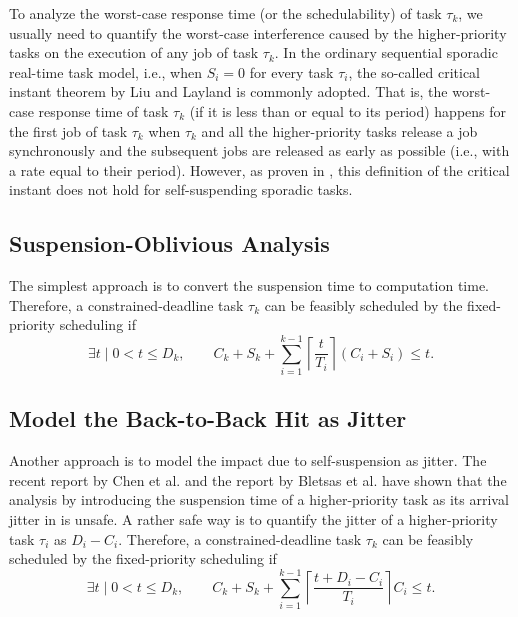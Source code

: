 \documentclass[10pt,conference,preprint]{IEEEtran}
\newcommand{\ceiling}[1]{\left\lceil{#1}\right\rceil}
\begin{document}
To analyze the worst-case response time (or the schedulability) of task $\tau_k$, we usually need to quantify the worst-case interference caused by the higher-priority tasks on the execution of any job of task $\tau_k$. In the ordinary sequential sporadic real-time task model, i.e., when $S_i=0$ for every task $\tau_i$, the so-called critical instant theorem by Liu and Layland \cite{Liu_1973} is commonly adopted. That is, the worst-case response time of task $\tau_k$ (if it is less than or equal to its period) happens for the first job of task $\tau_k$ when $\tau_k$ and all the higher-priority tasks release a job synchronously and the subsequent jobs are released as early as possible (i.e., with a rate equal to their period).  However, as proven in \cite{ecrts15nelissen}, this definition of the
critical instant does not hold for self-suspending sporadic tasks.  

\subsection{Suspension-Oblivious Analysis}
The simplest approach is to convert the suspension time to computation
time. Therefore, a constrained-deadline task $\tau_k$ can be feasibly
scheduled by the fixed-priority scheduling if
\begin{equation}
\label{eq:TDA-SO}
\exists t \mid 0 < t \leq D_k, \qquad C_k + S_k + \sum_{i=1}^{k-1}\ceiling{\frac{t}{T_i}} (C_i+S_i) \leq t.
\end{equation}

\subsection{Model the Back-to-Back Hit as Jitter}
\label{sec:jitter}

Another approach is to model the impact due to self-suspension as
jitter.  The recent report by Chen et al. and the report by Bletsas et
al. \cite{BletsasReport2015} have shown that the analysis by
introducing the suspension time of a higher-priority task as its
arrival jitter in
\cite{ECRTS-AudsleyB04,RTAS-AudsleyB04,RTCSA-KimCPKH95,MingLiRTCSA1994}
is unsafe.  A rather safe way is to quantify the jitter of a higher-priority
task $\tau_i$ as $D_i-C_i$. Therefore, a constrained-deadline task
$\tau_k$ can be feasibly scheduled by the fixed-priority scheduling if
\begin{equation}
\label{eq:TDA-jitter}
\exists t \mid 0 < t \leq D_k, \qquad C_k + S_k + \sum_{i=1}^{k-1}\ceiling{\frac{t+D_i-C_i}{T_i}} C_i \leq t.
\end{equation}
\end{document}
